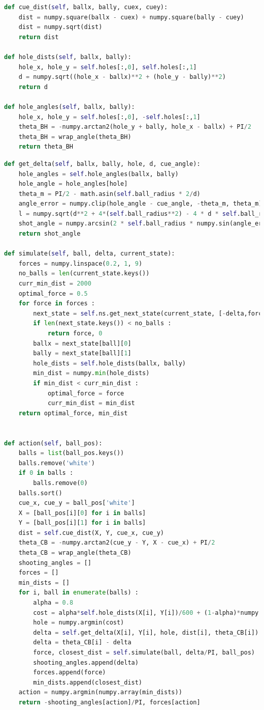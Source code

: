 \documentclass[11pt]{article}
\begin{document}
\begin{lstlisting}[language=Python]      
def cue_dist(self, ballx, bally, cuex, cuey):
    dist = numpy.square(ballx - cuex) + numpy.square(bally - cuey)
    dist = numpy.sqrt(dist)
    return dist

def hole_dists(self, ballx, bally):
    hole_x, hole_y = self.holes[:,0], self.holes[:,1]
    d = numpy.sqrt((hole_x - ballx)**2 + (hole_y - bally)**2)
    return d

def hole_angles(self, ballx, bally):
    hole_x, hole_y = self.holes[:,0], -self.holes[:,1]
    theta_BH = -numpy.arctan2(hole_y + bally, hole_x - ballx) + PI/2
    theta_BH = wrap_angle(theta_BH)
    return theta_BH
\end{lstlisting}
\begin{lstlisting}[language=Python]
def get_delta(self, ballx, bally, hole, d, cue_angle):
    hole_angles = self.hole_angles(ballx, bally)
    hole_angle = hole_angles[hole]
    theta_m = PI/2 - math.asin(self.ball_radius * 2/d)
    angle_error = numpy.clip(hole_angle - cue_angle, -theta_m, theta_m)
    l = numpy.sqrt(d**2 + 4*(self.ball_radius**2) - 4 * d * self.ball_radius * numpy.cos(angle_error))
    shot_angle = numpy.arcsin(2 * self.ball_radius * numpy.sin(angle_error) / l)
    return shot_angle

def simulate(self, ball, delta, current_state):
    forces = numpy.linspace(0.2, 1, 9)
    no_balls = len(current_state.keys())
    curr_min_dist = 2000
    optimal_force = 0.5
    for force in forces :
        next_state = self.ns.get_next_state(current_state, [-delta,force], seed=10)
        if len(next_state.keys()) < no_balls :
            return force, 0
        ballx = next_state[ball][0]
        bally = next_state[ball][1]
        hole_dists = self.hole_dists(ballx, bally)
        min_dist = numpy.min(hole_dists)
        if min_dist < curr_min_dist :
            optimal_force = force
            curr_min_dist = min_dist
    return optimal_force, min_dist
        

def action(self, ball_pos):
    balls = list(ball_pos.keys())
    balls.remove('white')
    if 0 in balls :
        balls.remove(0)
    balls.sort()
    cue_x, cue_y = ball_pos['white']
    X = [ball_pos[i][0] for i in balls]
    Y = [ball_pos[i][1] for i in balls]
    dist = self.cue_dist(X, Y, cue_x, cue_y)
    theta_CB = -numpy.arctan2(cue_y - Y, X - cue_x) + PI/2 
    theta_CB = wrap_angle(theta_CB)
    shooting_angles = []
    forces = []
    min_dists = []
    for i, ball in enumerate(balls) :
        alpha = 0.8
        cost = alpha*self.hole_dists(X[i], Y[i])/600 + (1-alpha)*numpy.absolute(self.hole_angles(X[i], Y[i])-theta_CB[i])
        hole = numpy.argmin(cost)
        delta = self.get_delta(X[i], Y[i], hole, dist[i], theta_CB[i])
        delta = theta_CB[i] - delta
        force, closest_dist = self.simulate(ball, delta/PI, ball_pos)
        shooting_angles.append(delta)
        forces.append(force)
        min_dists.append(closest_dist)
    action = numpy.argmin(numpy.array(min_dists))
    return -shooting_angles[action]/PI, forces[action]
\end{lstlisting}
\noindent
\newpage
\end{document}

